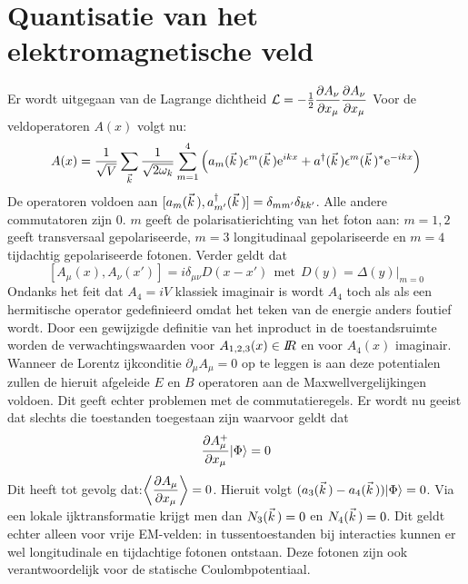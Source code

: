 \section[~~Quantisatie van het elektromagnetische veld]{Quantisatie van het elektromagnetische veld}
Er wordt uitgegaan van de Lagrange dichtheid
$\displaystyle{\cal L}=-\mbox{$\frac{1}{2}$}\frac{\partial A_\nu}{\partial x_\mu}\frac{\partial A_\nu}{\partial x_\mu}$
\npar
Voor de veldoperatoren $A(x)$ volgt nu:
\[
A(x)=\frac{1}{\sqrt{V}}\sum_{\vec{k}}\frac{1}{\sqrt{2\omega_k}}\sum_{m=1}^4
\left(a_m(\vec{k}\,)\epsilon^m(\vec{k}\,){\rm e}^{ikx}+
a^\dagger(\vec{k}\,)\epsilon^m(\vec{k}\,)^*{\rm e}^{-ikx}\right)
\]
De operatoren voldoen aan
$[a_m(\vec{k}\,),a_{m'}^\dagger(\vec{k}\,)]=\delta_{mm'}\delta_{kk'}$. Alle andere
commutatoren zijn 0. $m$ geeft de polarisatierichting van het foton aan:
$m=1,2$ geeft transversaal gepolariseerde, $m=3$ longitudinaal gepolariseerde
en $m=4$ tijdachtig gepolariseerde fotonen. Verder geldt dat
\[
[A_\mu(x),A_\nu(x')]=i\delta_{\mu\nu}D(x-x')~~\mbox{met}~~D(y)=\Delta(y)|_{m=0}
\]
Ondanks het feit dat $A_4=iV$ klassiek imaginair is wordt $A_4$ toch als
als een hermitische operator gedefinieerd omdat het teken van de energie
anders foutief wordt. Door een gewijzigde definitie van het inproduct in de
toestandsruimte worden de verwachtingswaarden voor $A_{1,2,3}(x)\in I\hspace{-1mm}R$ en
voor $A_4(x)$ imaginair.
\npar
Wanneer de Lorentz ijkconditie $\partial_\mu A_\mu=0$ op te leggen is aan
deze potentialen zullen de hieruit afgeleide $E$ en $B$ operatoren aan de
Maxwellvergelijkingen voldoen. Dit geeft echter problemen met de
commutatieregels. Er wordt nu geeist dat slechts die toestanden toegestaan
zijn waarvoor geldt dat
\[
\frac{\partial A^+_\mu}{\partial x_\mu}|\Phi\rangle=0
\]
Dit heeft tot gevolg dat:\hspace{3cm}$\displaystyle\left\langle \frac{\partial A_\mu}{\partial x_\mu} \right\rangle=0$.
\npar
Hieruit volgt $(a_3(\vec{k}\,)-a_4(\vec{k}\,))|\Phi\rangle=0$. Via een lokale
ijktransformatie krijgt men dan $N_3(\vec{k}\,)=0$ en $N_4(\vec{k}\,)=0$. Dit
geldt echter alleen voor vrije EM-velden: in tussentoestanden bij interacties
kunnen er wel longitudinale en tijdachtige fotonen ontstaan. Deze fotonen
zijn ook verantwoordelijk voor de statische Coulombpotentiaal.

